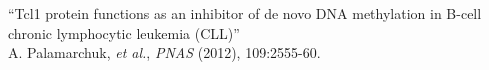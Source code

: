 ``Tcl1 protein functions as an inhibitor of de novo DNA methylation in B-cell chronic lymphocytic leukemia (CLL)'' \\
\small{A. Palamarchuk, \textit{et al.}, \textit{PNAS} (2012), 109:2555-60.} \\
